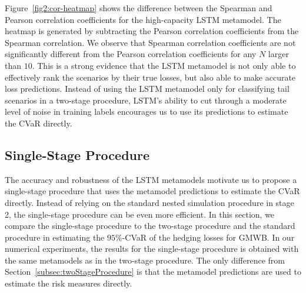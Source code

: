 Figure~\ref{fig2:cor-heatmap} shows the difference between the Spearman and Pearson correlation coefficients for the high-capacity LSTM metamodel.
The heatmap is generated by subtracting the Pearson correlation coefficients from the Spearman correlation.
We observe that Spearman correlation coefficients are not significantly different from the Pearson correlation coefficients for any $N$ larger than $\num{10}$. 
This is a strong evidence that the LSTM metamodel is not only able to effectively rank the scenarios by their true losses, but also able to make accurate loss predictions.
Instead of using the LSTM metamodel only for classifying tail scenarios in a two-stage procedure, LSTM's ability to cut through a moderate level of noise in training labels encourages us to use its predictions to estimate the CVaR directly. 

\subsection{Single-Stage Procedure}

The accuracy and robustness of the LSTM metamodels motivate us to propose a single-stage procedure that uses the metamodel predictions to estimate the CVaR directly. 
Instead of relying on the standard nested simulation procedure in stage 2, the single-stage procedure can be even more efficient.
In this section, we compare the single-stage procedure to the two-stage procedure and the standard procedure in estimating the $95\%$-CVaR of the hedging losses for GMWB.
In our numerical experiments, the results for the single-stage procedure is obtained with the same metamodels as in the two-stage procedure.
The only difference from Section~\ref{subsec:twoStageProcedure} is that the metamodel predictions are used to estimate the risk measures directly.


